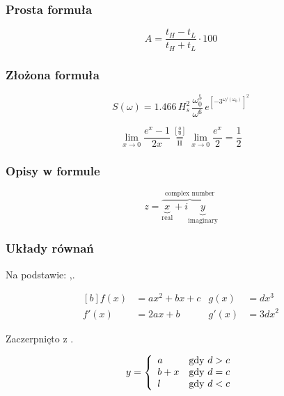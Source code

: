\subsubsection{Prosta formuła}

\begin{equation}
	A = \frac{t_H - t_L}{t_H+t_L} \cdot 100
\label{eq:asym}
\end{equation}

\subsubsection{Złożona formuła}
\begin{equation} 
S(\omega)=1.466\, H_s^2 \,  \frac{\omega_0^5}{\omega^6}  \, e^{\left[-3^{\omega/(\omega_0)}\right]^2}
\label{eq:S}
\end{equation}

\begin{equation} 
\lim_{x\to 0}{\frac{e^x-1}{2x}}
 \overset{\left[\frac{0}{0}\right]}{\underset{\mathrm{H}}{=}}
 \lim_{x\to 0}{\frac{e^x}{2}}={\frac{1}{2}}
\label{eq:lim}
\end{equation}

\subsubsection{Opisy w formule}

\begin{equation} 
z = \overbrace{
   \underbrace{x}_\text{real} + i
   \underbrace{y}_\text{imaginary}
  }^\text{complex number}
	\label{eq:CN}
\end{equation}

\subsubsection{Układy równań}

Na podstawie: \cite{noauthor_latexadvanced_nodate},\cite{noauthor_numbering_nodate}.

\begin{equation} 
\begin{aligned}[b]
 f(x)  &= a x^2+b x +c   &   g(x)  &= d x^3 \\
 f'(x) &= 2 a x +b       &   g'(x) &= 3 d x^2
\end{aligned}
	\label{eq:aligned}
\end{equation}

Zaczerpnięto z \cite{noauthor_latex_nodate}.

\begin{equation} 
y = \left\{ \begin{array}{ll}
a & \textrm{gdy $d>c$}\\
b+x & \textrm{gdy $d=c$}\\
l & \textrm{gdy $ d < c $}
\end{array} \right.
	\label{eq:eqnarray}
\end{equation}


